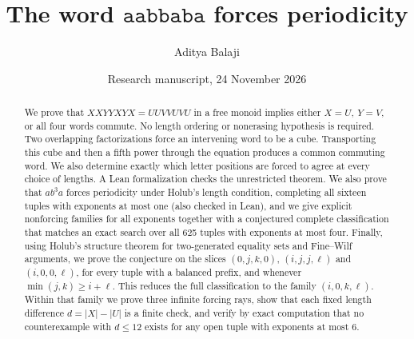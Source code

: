 \documentclass[11pt]{article}
\title{The word \(\mathtt{aabbaba}\) forces periodicity}
\author{Aditya Balaji}
\date{Research manuscript, 24 November 2026}
\theoremstyle{remark}\newtheorem*{remark}{Remark}
\begin{document}
\maketitle
\begin{abstract}
We prove that \(XXYYXYX=UUVVUVU\) in a free monoid implies either \(X=U,\ Y=V\), or all four words commute. No length ordering or nonerasing hypothesis is required. Two overlapping factorizations force an intervening word to be a cube. Transporting this cube and then a fifth power through the equation produces a common commuting word. We also determine exactly which letter positions are forced to agree at every choice of lengths. A Lean formalization checks the unrestricted theorem. We also prove that \(ab^3a\) forces periodicity under Holub's length condition, completing all sixteen tuples with exponents at most one (also checked in Lean), and we give explicit nonforcing families for all exponents together with a conjectured complete classification that matches an exact search over all 625 tuples with exponents at most four. Finally, using Holub's structure theorem for two-generated equality sets and Fine--Wilf arguments, we prove the conjecture on the slices \((0,j,k,0)\), \((i,j,j,\ell)\) and \((i,0,0,\ell)\), for every tuple with a balanced prefix, and whenever \(\min(j,k)\ge i+\ell\). This reduces the full classification to the family \((i,0,k,\ell)\). Within that family we prove three infinite forcing rays, show that each fixed length difference \(d=|X|-|U|\) is a finite check, and verify by exact computation that no counterexample with \(d\le12\) exists for any open tuple with exponents at most \(6\).
\end{abstract}
\end{document}
